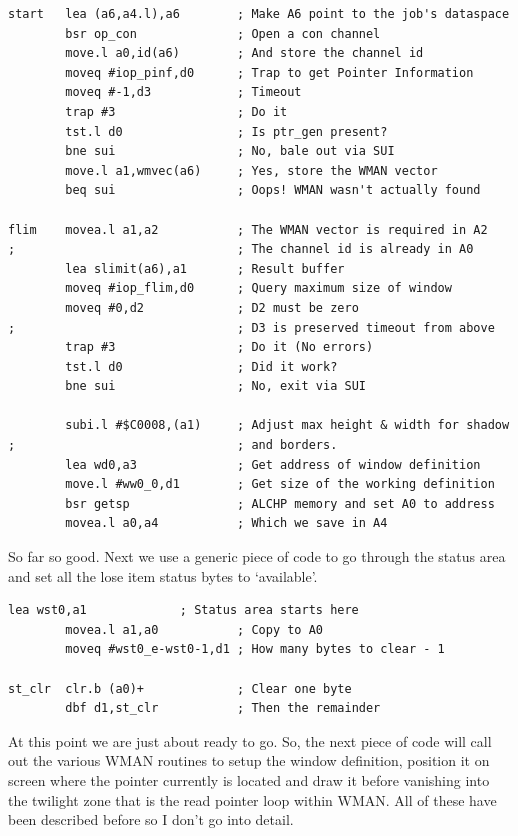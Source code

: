 \begin{lstlisting}[firstnumber=last,caption={ApplTest\_asm - Initialisation}]
start   lea (a6,a4.l),a6        ; Make A6 point to the job's dataspace
        bsr op_con              ; Open a con channel
        move.l a0,id(a6)        ; And store the channel id
        moveq #iop_pinf,d0      ; Trap to get Pointer Information
        moveq #-1,d3            ; Timeout
        trap #3                 ; Do it
        tst.l d0                ; Is ptr_gen present?
        bne sui                 ; No, bale out via SUI
        move.l a1,wmvec(a6)     ; Yes, store the WMAN vector
        beq sui                 ; Oops! WMAN wasn't actually found

flim    movea.l a1,a2           ; The WMAN vector is required in A2
;                               ; The channel id is already in A0
        lea slimit(a6),a1       ; Result buffer
        moveq #iop_flim,d0      ; Query maximum size of window
        moveq #0,d2             ; D2 must be zero
;                               ; D3 is preserved timeout from above
        trap #3                 ; Do it (No errors)
        tst.l d0                ; Did it work?
        bne sui                 ; No, exit via SUI

        subi.l #$C0008,(a1)     ; Adjust max height & width for shadow
;                               ; and borders. 
        lea wd0,a3              ; Get address of window definition
        move.l #ww0_0,d1        ; Get size of the working definition
        bsr getsp               ; ALCHP memory and set A0 to address
        movea.l a0,a4           ; Which we save in A4
\end{lstlisting}

So far so good. Next we use a generic piece of code to go through
    the status area and set all the lose item status bytes to
    `available'.

\begin{lstlisting}[firstnumber=last,caption={ApplTest\_asm - Loose Item Initialisation}]
        lea wst0,a1             ; Status area starts here
        movea.l a1,a0           ; Copy to A0
        moveq #wst0_e-wst0-1,d1 ; How many bytes to clear - 1

st_clr  clr.b (a0)+             ; Clear one byte
        dbf d1,st_clr           ; Then the remainder
\end{lstlisting}

At this point we are just about ready to go. So, the next piece of
    code will call out the various WMAN routines to
    setup the window definition, position it on screen where the pointer
    currently is located and draw it before vanishing into the twilight zone
    that is the read pointer loop within WMAN. All
    of these have been described before so I don't go into detail.

